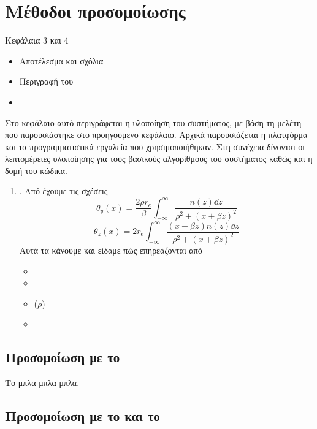 \chapter{Μέθοδοι προσομοίωσης}
Κεφάλαια 3 και 4
\begin{itemize}
\item Αποτέλεσμα και σχόλια
\item Περιγραφή του 
\item {}
\end{itemize}
Στο κεφάλαιο αυτό περιγράφεται η υλοποίηση του συστήματος, με βάση
τη μελέτη που παρουσιάστηκε στο προηγούμενο κεφάλαιο. Αρχικά
παρουσιάζεται η πλατφόρμα και τα προγραμματιστικά εργαλεία που
χρησιμοποιήθηκαν. Στη συνέχεια δίνονται οι λεπτομέρειες υλοποίησης
για τους βασικούς αλγορίθμους του συστήματος καθώς και η δομή του
κώδικα.

\begin{enumerate}
	\item {}. Από \cite{Locatchov1999} έχουμε τις σχέσεις 
		\begin{equation}
			\theta_y (x) = \frac{2 \rho r_e}{\beta} \int_{-\infty}^{\infty}\frac{n(z) \dd z}{\rho^2 + \left(x+\beta z \right) ^2}
		\end{equation}
		\begin{equation}
			\theta_z(x) = 2 r_e \int_{-\infty}^{\infty}\frac{(x+\beta z)n(z) \dd z}{\rho^2 + \left(x+\beta z \right) ^2}
		\end{equation}
		Αυτά τα κάνουμε  και είδαμε πώς επηρεάζονται από 
		\begin{itemize}
			\item {}
			\item {}
			\item {} ($\rho$) 
			\item {} 
		\end{itemize}   
\end{enumerate}

\section{Προσομοίωση με το }
Το  μπλα μπλα μπλα.

\section{Προσομοίωση με το  και το }

